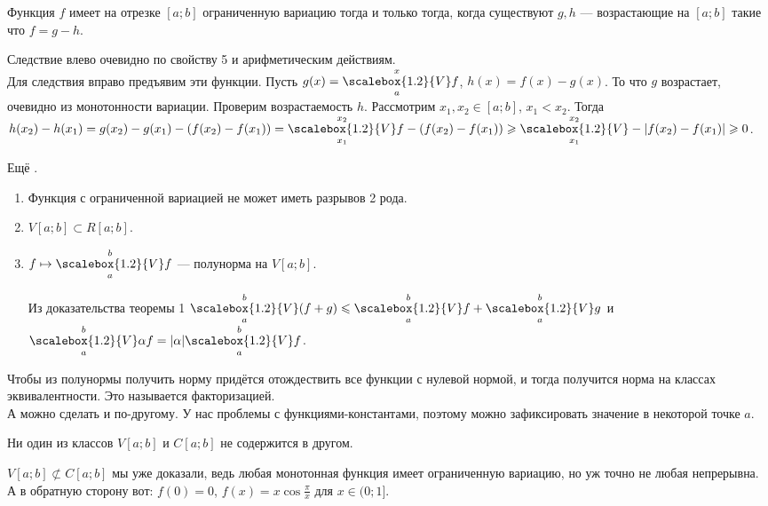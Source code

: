 \documentclass{article}
\newcommand*{\Var}[2]{{\overset{#2}{\underset{#1}{\scalebox{1.2}{V}}}}}
\begin{document}
\begin{itemize}
\begin{Proof}
        \end{Proof}
        \thm Функция $f$ имеет на отрезке $[a;b]$ ограниченную вариацию тогда и только тогда, когда существуют $g,h$ --- возрастающие на $[a;b]$ такие что $f=g-h$.
        \begin{Proof}
            Следствие влево очевидно по свойству 5 и арифметическим действиям.\\
            Для следствия вправо предъявим эти функции. Пусть $g(x)=\Var axf$, $h(x)=f(x)-g(x)$. То что $g$ возрастает, очевидно из монотонности вариации. Проверим возрастаемость $h$. Рассмотрим $x_1,x_2\in[a;b]$, $x_1<x_2$. Тогда $h(x_2)-h(x_1)=g(x_2)-g(x_1)-(f(x_2)-f(x_1))=\Var{x_1}{x_2}f-(f(x_2)-f(x_1))\geqslant\Var{x_1}{x_2}-|f(x_2)-f(x_1)|\geqslant0$.
        \end{Proof}
        \thm Ещё .
        \begin{enumerate}
            \addtocounter{enumi}{6}
            \item Функция с ограниченной вариацией не может иметь разрывов 2 рода.
            \item $V[a;b]\subset R[a;b]$.
            \item $f\mapsto\Var abf$ --- полунорма на $V[a;b]$.
            \begin{Proof}
                Из доказательства теоремы 1 $\Var ab(f+g)\leqslant\Var abf+\Var abg$ и $\Var ab\alpha f=|\alpha|\Var abf$.
            \end{Proof}
        \end{enumerate}
        \begin{Comment}
            Чтобы из полунормы получить норму придётся отождествить все функции с нулевой нормой, и тогда получится норма на классах эквивалентности. Это называется факторизацией.\\
            А можно сделать и по-другому. У нас проблемы с функциями-константами, поэтому можно зафиксировать значение в некоторой точке $a$.
        \end{Comment}
        \thm Ни один из классов $V[a;b]$ и $C[a;b]$ не содержится в другом.
        \begin{Proof}
            $V[a;b]\not\subset C[a;b]$ мы уже доказали, ведь любая монотонная функция имеет ограниченную вариацию, но уж точно не любая непрерывна.\\
            А в обратную сторону вот: $f(0)=0$, $f(x)=x\cos\frac\pi x$ для $x\in(0;1]$.
            \begin{center}

\end{center}
\end{Proof}
\end{itemize}
\end{document}
